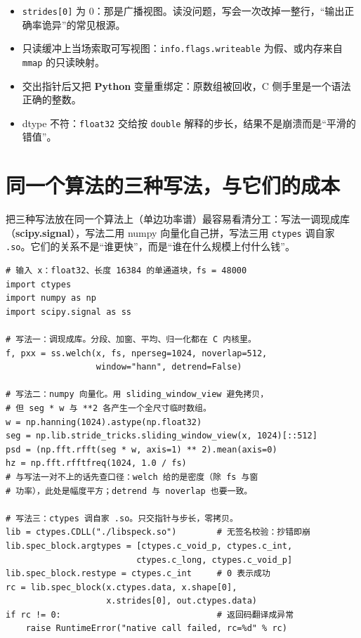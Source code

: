 \documentclass[12pt,a4paper,fontset=fandol]{ctexbook}
\newcommand{\Tp}[1]{\texttt{#1}}
\newcommand{\Lib}[1]{\textbf{#1}}
\newcommand{\Lang}[1]{\textsf{\bfseries #1}}
\newcommand{\PY}{\Lang{Python}}
\begin{document}
\begin{note}[title={零拷贝的四个失效瞬间}]
\begin{itemize}
\item \Tp{strides[0]} 为 $0$：那是广播视图。读没问题，写会一次改掉一整行，``输出正确率诡异''的常见根源。
\item 只读缓冲上当场索取可写视图：\Tp{info.flags.writeable} 为假、或内存来自 \Tp{mmap} 的只读映射。
\item 交出指针后又把 \PY{} 变量重绑定：原数组被回收，C 侧手里是一个语法正确的整数。
\item dtype 不符：\Tp{float32} 交给按 \Tp{double} 解释的步长，结果不是崩溃而是``平滑的错值''。
\end{itemize}
\end{note}

\section{同一个算法的三种写法，与它们的成本}

把三种写法放在同一个算法上（单边功率谱）最容易看清分工：写法一调现成库（\Lib{scipy.signal}），写法二用 numpy 向量化自己拼，写法三用 \Tp{ctypes} 调自家 \Tp{.so}。它们的关系不是``谁更快''，而是``谁在什么规模上付什么钱''。

\begin{lstlisting}[style=pythonstyle,caption={单边谱的三种写法：现成库、向量化、ctypes 调自家 .so},label={lst:ch16-three}]
# 输入 x：float32、长度 16384 的单通道块，fs = 48000
import ctypes
import numpy as np
import scipy.signal as ss

# 写法一：调现成库。分段、加窗、平均、归一化都在 C 内核里。
f, pxx = ss.welch(x, fs, nperseg=1024, noverlap=512,
                  window="hann", detrend=False)

# 写法二：numpy 向量化。用 sliding_window_view 避免拷贝，
# 但 seg * w 与 **2 各产生一个全尺寸临时数组。
w = np.hanning(1024).astype(np.float32)
seg = np.lib.stride_tricks.sliding_window_view(x, 1024)[::512]
psd = (np.fft.rfft(seg * w, axis=1) ** 2).mean(axis=0)
hz = np.fft.rfftfreq(1024, 1.0 / fs)
# 与写法一对不上的话先查口径：welch 给的是密度（除 fs 与窗
# 功率），此处是幅度平方；detrend 与 noverlap 也要一致。

# 写法三：ctypes 调自家 .so。只交指针与步长，零拷贝。
lib = ctypes.CDLL("./libspeck.so")        # 无签名校验：抄错即崩
lib.spec_block.argtypes = [ctypes.c_void_p, ctypes.c_int,
                          ctypes.c_long, ctypes.c_void_p]
lib.spec_block.restype = ctypes.c_int     # 0 表示成功
rc = lib.spec_block(x.ctypes.data, x.shape[0],
                    x.strides[0], out.ctypes.data)
if rc != 0:                               # 返回码翻译成异常
    raise RuntimeError("native call failed, rc=%d" % rc)
\end{lstlisting}
\end{document}
